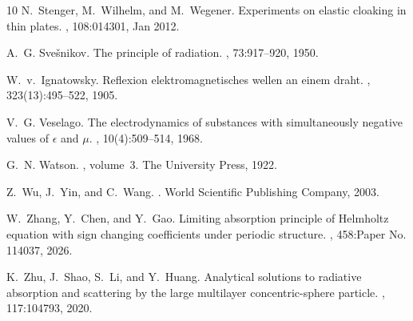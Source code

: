 \documentclass[12pt,reqno]{amsart}
\numberwithin{equation}{section}
\begin{document}
\begin{thebibliography}{10}
N.~Stenger, M.~Wilhelm, and M.~Wegener.
\newblock Experiments on elastic cloaking in thin plates.
, 108:014301, Jan 2012.

A.~G. Sve\v{s}nikov.
\newblock The principle of radiation.
, 73:917--920, 1950.

W.~v.~Ignatowsky.
\newblock Reflexion elektromagnetisches wellen an einem draht.
, 323(13):495--522, 1905.

V.~G. Veselago.
\newblock The electrodynamics of substances with simultaneously negative values
  of $\epsilon$ and $\mu$.
, 10(4):509--514, 1968.

G.~N. Watson.
, volume~3.
\newblock The University Press, 1922.

Z.~Wu, J.~Yin, and C.~Wang.
.
\newblock World Scientific Publishing Company, 2003.

W.~Zhang, Y.~Chen, and Y.~Gao.
\newblock Limiting absorption principle of {H}elmholtz equation with sign
  changing coefficients under periodic structure.
, 458:Paper No. 114037, 2026.

K.~Zhu, J.~Shao, S.~Li, and Y.~Huang.
\newblock Analytical solutions to radiative absorption and scattering by the
  large multilayer concentric-sphere particle.
,
  117:104793, 2020.

\end{thebibliography}













%
%




	
\end{document}
